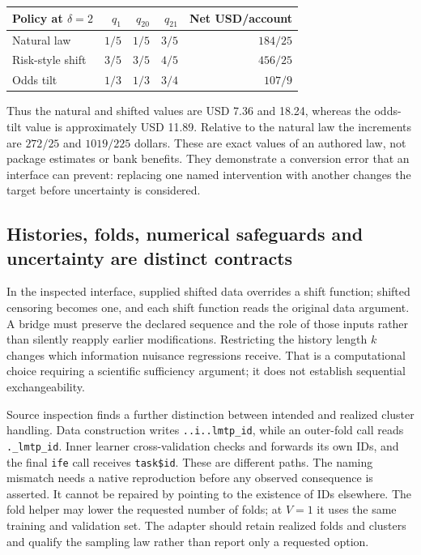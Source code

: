 \begin{center}
\begin{tabular}{lrrrr}
\hline
Policy at $\delta=2$ & $q_1$ & $q_{20}$ & $q_{21}$ & Net USD/account\\
\hline
Natural law & $1/5$ & $1/5$ & $3/5$ & $184/25$\\
Risk-style shift & $3/5$ & $3/5$ & $4/5$ & $456/25$\\
Odds tilt & $1/3$ & $1/3$ & $3/4$ & $107/9$\\
\hline
\end{tabular}
\end{center}

Thus the natural and shifted values are USD 7.36 and 18.24, whereas the
odds-tilt value is approximately USD 11.89. Relative to the natural law the
increments are $272/25$ and $1019/225$ dollars. These are exact values of an
authored law, not package estimates or bank benefits. They demonstrate a
conversion error that an interface can prevent: replacing one named
intervention with another changes the target before uncertainty is considered.

\subsection{Histories, folds, numerical safeguards and uncertainty are distinct contracts}
\label{exec23:lmtp-conversion}

In the inspected interface, supplied shifted data overrides a shift function;
shifted censoring becomes one, and each shift function reads the original data
argument. A bridge must preserve the declared sequence and the role of those
inputs rather than silently reapply earlier modifications. Restricting the
history length $k$ changes which information nuisance regressions receive.
That is a computational choice requiring a scientific sufficiency argument;
it does not establish sequential exchangeability.
\citep{exec22_lmtp_reuse}

Source inspection finds a further distinction between intended and realized
cluster handling. Data construction writes \texttt{..i..lmtp\_id}, while an
outer-fold call reads \texttt{.\_lmtp\_id}. Inner learner cross-validation
checks and forwards its own IDs, and the final \texttt{ife} call receives
\texttt{task\$id}. These are different paths. The naming mismatch needs a
native reproduction before any observed consequence is asserted. It cannot
be repaired by pointing to the existence of IDs elsewhere. The fold helper
may lower the requested number of folds; at $V=1$ it uses the same training
and validation set. The adapter should retain realized folds and clusters
and qualify the sampling law rather than report only a requested option.

